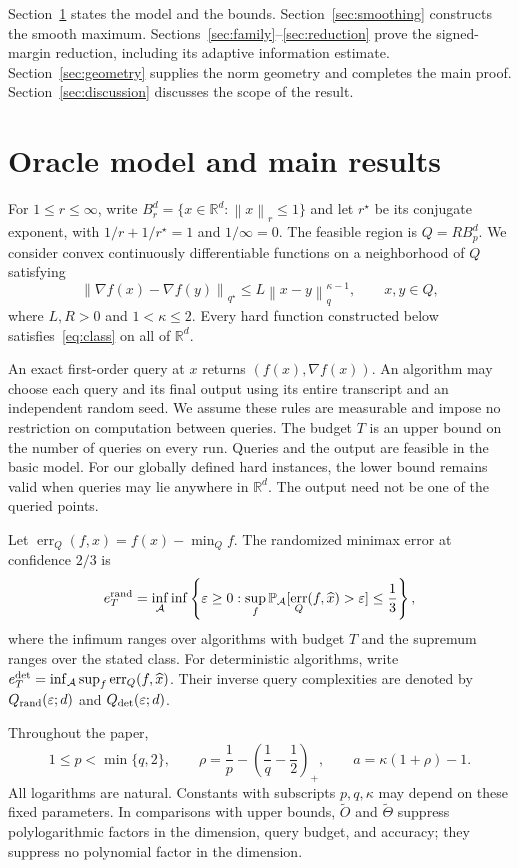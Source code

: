 \documentclass[11pt,a4paper]{article}
\theoremstyle{definition}
\theoremstyle{remark}
\newcommand{\R}{\mathbb R}
\newcommand{\Prb}{\mathbb P}
\newcommand{\eps}{\varepsilon}
\newcommand{\norm}[1]{\left\lVert #1\right\rVert}
\DeclareMathOperator{\err}{err}
\begin{document}
Section~\ref{sec:results} states the model and the bounds.
Section~\ref{sec:smoothing} constructs the smooth maximum.
Sections~\ref{sec:family}--\ref{sec:reduction} prove the signed-margin
reduction, including its adaptive information estimate.
Section~\ref{sec:geometry} supplies the norm geometry and completes the main
proof. Section~\ref{sec:discussion} discusses the scope of the result.

\section{Oracle model and main results}\label{sec:results}

For $1\le r\le\infty$, write
$B_r^d=\{x\in\R^d:\norm{x}_r\le1\}$ and let $r^\star$ be its conjugate
exponent, with $1/r+1/r^\star=1$ and $1/\infty=0$.
The feasible region is $Q=RB_p^d$. We consider convex continuously
differentiable functions on a neighborhood of $Q$ satisfying
\begin{equation}\label{eq:class}
  \norm{\nabla f(x)-\nabla f(y)}_{q^\star}
  \le L\norm{x-y}_q^{\kappa-1},
  \qquad x,y\in Q,
\end{equation}
where $L,R>0$ and $1<\kappa\le2$. Every hard function constructed below
satisfies~\eqref{eq:class} on all of $\R^d$.

An exact first-order query at $x$ returns $(f(x),\nabla f(x))$.
An algorithm may choose each query and its final output using its entire
transcript and an independent random seed. We assume these rules are
measurable and impose no restriction on computation between queries.
The budget $T$ is an upper bound on the number of queries on every run.
Queries and the output are feasible in the basic model. For our globally
defined hard instances, the lower bound remains valid when queries may lie
anywhere in $\R^d$.
The output need not be one of the queried points.

Let $\err_Q(f,x)=f(x)-\min_Q f$. The randomized minimax error at confidence
$2/3$ is
\[
  e_T^{\rm rand}
  =\inf_{\mathcal A}\inf\left\{\eps\ge0:
    \sup_f\Prb_{\mathcal A}
       [\err_Q(f,\widehat x)>\eps]\le\frac13\right\},
\]
where the infimum ranges over algorithms with budget $T$ and the supremum
ranges over the stated class. For deterministic algorithms, write
$e_T^{\rm det}=\inf_{\mathcal A}\sup_f\err_Q(f,\widehat x)$.
Their inverse query complexities are denoted by
$Q_{\rm rand}(\eps;d)$ and $Q_{\rm det}(\eps;d)$.

Throughout the paper,
\begin{equation}\label{eq:rho}
  1\le p<\min\{q,2\},\qquad
  \rho=\frac1p-\left(\frac1q-\frac12\right)_+,
  \qquad a=\kappa(1+\rho)-1.
\end{equation}
All logarithms are natural. Constants with subscripts $p,q,\kappa$ may depend
on these fixed parameters. In comparisons with upper bounds,
$\widetilde O$ and $\widetilde\Theta$ suppress polylogarithmic factors in the
dimension, query budget, and accuracy; they suppress no polynomial factor in
the dimension.
\end{document}
